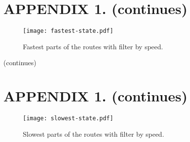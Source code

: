 \section*{APPENDIX 1. (continues)}

\vfill

\begin{figure}[ht]
  \centering
  \captionsetup{justification=centering,margin=0.2cm}
  \texttt{[image: fastest-state.pdf]}
  \caption{Fastest parts of the routes with filter by speed.}
  \label{pic:fasteststate}
\end{figure}

\vfill
\begin{flushright}
  (continues)
\end{flushright}

\section*{APPENDIX 1. (continues)}

\vfill

\begin{figure}[ht]
  \centering
  \captionsetup{justification=centering,margin=0.2cm}
  \texttt{[image: slowest-state.pdf]}
  \caption{Slowest parts of the routes with filter by speed.}
  \label{pic:sloweststate}
\end{figure}

\vfill